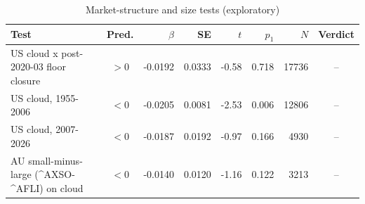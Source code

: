 \begin{table}[htbp]\centering\small
\caption{Market-structure and size tests (exploratory)}
\begin{tabular}{lcrrrrrc}\toprule
Test & Pred. & $\beta$ & SE & $t$ & $p_{1}$ & $N$ & Verdict \\ \midrule
US cloud x post-2020-03 floor closure & $>$0 & -0.0192 & 0.0333 & -0.58 & 0.718 & 17736 & -- \\
US cloud, 1955-2006 & $<$0 & -0.0205 & 0.0081 & -2.53 & 0.006 & 12806 & -- \\
US cloud, 2007-2026 & $<$0 & -0.0187 & 0.0192 & -0.97 & 0.166 & 4930 & -- \\
AU small-minus-large (^AXSO-^AFLI) on cloud & $<$0 & -0.0140 & 0.0120 & -1.16 & 0.122 & 3213 & -- \\
\bottomrule\end{tabular}\end{table}
